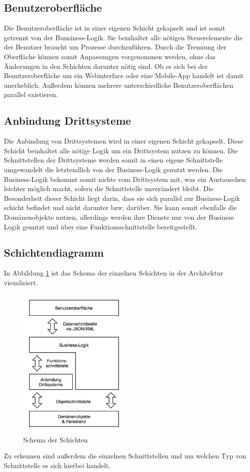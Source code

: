 \documentclass[a4paper,12pt]{article} %
\begin{document}
\subsection{Benutzeroberfläche}
Die Benutzeroberfläche ist in einer eigenen Schicht gekapselt und ist somit getrennt von der Bunsiness-Logik. Sie beinhaltet alle nötigen Steuerelemente die der Benutzer braucht um Prozesse durchzuführen. Durch die Trennung der Oberfläche können somit Anpassungen vorgenommen werden, ohne das Änderungen in den Schichten darunter nötig sind. Ob es sich bei der Benutzeroberfläche um ein Webinterface oder eine Mobile-App handelt ist damit unerheblich. Außerdem können mehrere unterschiedliche Benutzeroberflächen parallel existieren.

\subsection{Anbindung Drittsysteme}
Die Anbindung von Drittsystemen wird in einer eigenen Schicht gekapselt. Diese Schicht beinhaltet alle nötige Logik um ein Drittsystem nutzen zu können. Die Schnittstellen der Drittsysteme werden somit in einen eigene Schnittstelle umgewandelt die letztendlich von der Business-Logik genutzt werden. Die Business-Logik bekommt somit nichts vom Drittsystem mit, was ein Austauschen leichter möglich macht, sofern die Schnittstelle unverändert bleibt. Die Besonderheit dieser Schicht liegt darin, dass sie sich parallel zur Business-Logik schicht befindet und nicht darunter bzw. darüber. Sie kann somit ebenfalls die Domänenobjekte nutzen, allerdings werden ihre Dienste nur von der Business Logik genutzt und über eine Funktionsschnittstelle bereitgestellt.

\subsection{Schichtendiagramm}
In Abbildung \ref{fig:architektur} ist das Schema der einzelnen Schichten in der Architektur visualisiert.
\begin{figure}[ht]
	\centering
	\includegraphics[width=0.5\textwidth]{img/architektur.png}
	\caption{Schema der Schichten}
	\label{fig:architektur}
\end{figure}
Zu erkennen sind außerdem die einzelnen Schnittstellen und um welchen Typ von Schnittstelle es sich hierbei handelt.
\end{document}
